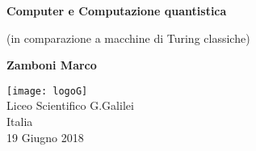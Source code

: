 \begin{titlepage}
    \begin{center}
        \vspace*{1cm}
        
        \Huge
        \textbf{Computer e Computazione quantistica}
        
        \vspace{0.5cm}
		\LARGE        
        (in comparazione a macchine di Turing classiche)
        
        \vspace{1.5cm}
        \huge
        \textbf{Zamboni Marco}
        
        \vfill
        
		\texttt{[image: logoG]}\\		
		\vspace{1.0cm}		
		\Large        
        Liceo Scientifico G.Galilei\\
        Italia\\
        19 Giugno 2018
        
    \end{center}
\end{titlepage}